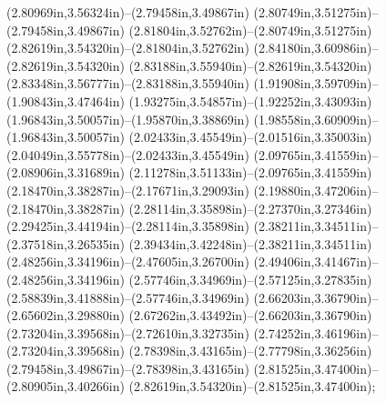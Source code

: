 (2.80969in,3.56324in)--(2.79458in,3.49867in) (2.80749in,3.51275in)--(2.79458in,3.49867in) (2.81804in,3.52762in)--(2.80749in,3.51275in) (2.82619in,3.54320in)--(2.81804in,3.52762in) (2.84180in,3.60986in)--(2.82619in,3.54320in) (2.83188in,3.55940in)--(2.82619in,3.54320in) (2.83348in,3.56777in)--(2.83188in,3.55940in) (1.91908in,3.59709in)--(1.90843in,3.47464in) (1.93275in,3.54857in)--(1.92252in,3.43093in) (1.96843in,3.50057in)--(1.95870in,3.38869in) (1.98558in,3.60909in)--(1.96843in,3.50057in) (2.02433in,3.45549in)--(2.01516in,3.35003in) (2.04049in,3.55778in)--(2.02433in,3.45549in) (2.09765in,3.41559in)--(2.08906in,3.31689in) (2.11278in,3.51133in)--(2.09765in,3.41559in) (2.18470in,3.38287in)--(2.17671in,3.29093in) (2.19880in,3.47206in)--(2.18470in,3.38287in) (2.28114in,3.35898in)--(2.27370in,3.27346in) (2.29425in,3.44194in)--(2.28114in,3.35898in) (2.38211in,3.34511in)--(2.37518in,3.26535in) (2.39434in,3.42248in)--(2.38211in,3.34511in) (2.48256in,3.34196in)--(2.47605in,3.26700in) (2.49406in,3.41467in)--(2.48256in,3.34196in) (2.57746in,3.34969in)--(2.57125in,3.27835in) (2.58839in,3.41888in)--(2.57746in,3.34969in) (2.66203in,3.36790in)--(2.65602in,3.29880in) (2.67262in,3.43492in)--(2.66203in,3.36790in) (2.73204in,3.39568in)--(2.72610in,3.32735in) (2.74252in,3.46196in)--(2.73204in,3.39568in) (2.78398in,3.43165in)--(2.77798in,3.36256in) (2.79458in,3.49867in)--(2.78398in,3.43165in) (2.81525in,3.47400in)--(2.80905in,3.40266in) (2.82619in,3.54320in)--(2.81525in,3.47400in);
